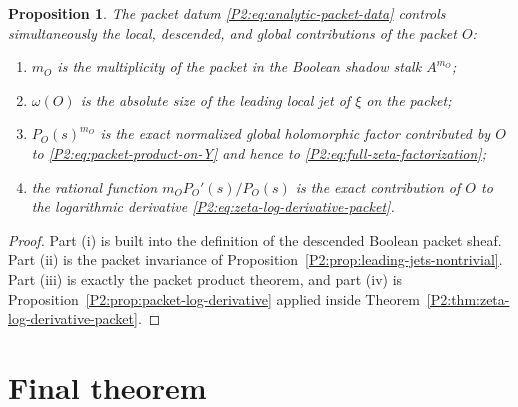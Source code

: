 \documentclass[11pt,a4paper]{article}
\numberwithin{equation}{section}
\newtheorem{proposition}[theorem]{Proposition}
\theoremstyle{definition}
\theoremstyle{remark}
\begin{document}
\begin{proposition}\label{P2:prop:analytic-packet-data-complete}
The packet datum \eqref{P2:eq:analytic-packet-data} controls simultaneously the local, descended, and global contributions of the packet $O$:
\begin{enumerate}[label=(\roman*)]
\item $m_O$ is the multiplicity of the packet in the Boolean shadow stalk $A^{m_O}$;
\item $\omega(O)$ is the absolute size of the leading local jet of $\xi$ on the packet;
\item $P_O(s)^{m_O}$ is the exact normalized global holomorphic factor contributed by $O$ to \eqref{P2:eq:packet-product-on-Y} and hence to \eqref{P2:eq:full-zeta-factorization};
\item the rational function $m_O P_O'(s)/P_O(s)$ is the exact contribution of $O$ to the logarithmic derivative \eqref{P2:eq:zeta-log-derivative-packet}.
\end{enumerate}
\end{proposition}

\begin{proof}
Part (i) is built into the definition of the descended Boolean packet sheaf.  Part (ii) is the packet invariance of Proposition~\ref{P2:prop:leading-jets-nontrivial}.  Part (iii) is exactly the packet product theorem, and part (iv) is Proposition~\ref{P2:prop:packet-log-derivative} applied inside Theorem~\ref{P2:thm:zeta-log-derivative-packet}.
\end{proof}

\section{Final theorem}
\end{document}

